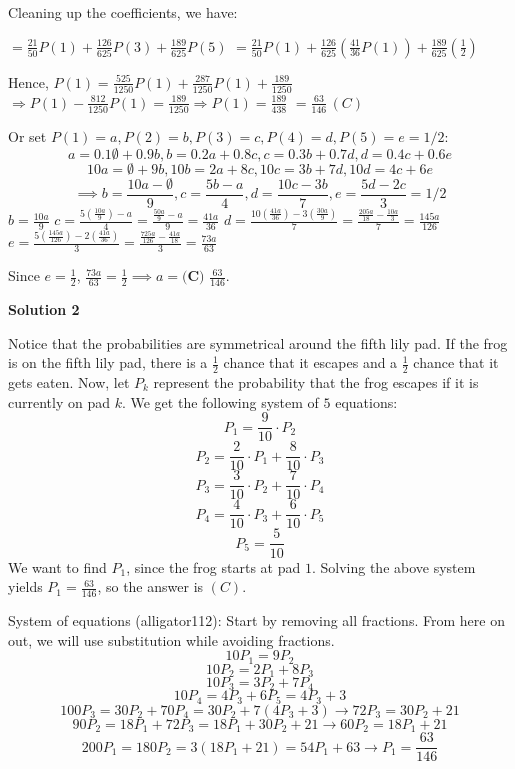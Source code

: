 \begin{enumerate}
 Cleaning up the coefficients, we have: 

 $= \frac {21} {50}P(1) + \frac {126} {625}P(3) + \frac {189} {625}P(5)$
$= \frac {21} {50}P(1) + \frac {126} {625}\left(\frac {41} {36}P(1)\right) + \frac {189} {625}\left(\frac {1} {2}\right)$

 Hence, $P(1) = \frac {525} {1250}P(1) + \frac {287} {1250}P(1) + \frac {189} {1250}$
$\Rightarrow P(1) - \frac {812} {1250}P(1) = \frac {189} {1250} \Rightarrow P(1) = \frac {189} {438}$
$= \boxed{\frac {63} {146}\, (C)}$

 Or set $P(1)=a,P(2)=b,P(3)=c,P(4)=d,P(5)=e=1/2$:
 \[a=0.1\emptyset+0.9b,b=0.2a+0.8c,c=0.3b+0.7d,d=0.4c+0.6e\]
 \[10a=\emptyset+9b,10b=2a+8c,10c=3b+7d,10d=4c+6e\]
 \[\implies b=\frac{10a-\emptyset}{9},c=\frac{5b-a}{4},d=\frac{10c-3b}{7},e=\frac{5d-2c}{3}=1/2\]$b=\frac{10a}{9}$
$c=\frac{5\left(\frac{10a}{9}\right)-a}{4}=\frac{\frac{50a}{9}-a}{9}=\frac{41a}{36}$
$d=\frac{10\left(\frac{41a}{36}\right)-3\left(\frac{30a}{9}\right)}{7}=\frac{\frac{205a}{18}-\frac{10a}{3}}{7}=\frac{145a}{126}$
$e=\frac{5\left(\frac{145a}{126}\right)-2\left(\frac{41a}{36}\right)}{3}=\frac{\frac{725a}{126}-\frac{41a}{18}}{3}=\frac{73a}{63}$

 Since $e=\frac{1}{2}$, $\frac{73a}{63}=\frac{1}{2}\implies a=\boxed{\textbf{(C) }\frac{63}{146}}$.

 



\textbf{Solution 2}

Notice that the probabilities are symmetrical around the fifth lily pad. If the frog is on the fifth lily pad, there is a $\frac{1}{2}$ chance that it escapes and a $\frac{1}{2}$ chance that it gets eaten. Now, let $P_k$ represent the probability that the frog escapes if it is currently on pad $k$. We get the following system of $5$ equations:
 \[P_1=\frac{9}{10}\cdot P_2\]
 \[P_2=\frac{2}{10}\cdot P_1 + \frac{8}{10}\cdot P_3\]
 \[P_3=\frac{3}{10}\cdot P_2 + \frac{7}{10}\cdot P_4\]
 \[P_4=\frac{4}{10}\cdot P_3 + \frac{6}{10}\cdot P_5\]
 \[P_5=\frac{5}{10}\]We want to find $P_1$, since the frog starts at pad $1$. Solving the above system yields $P_1=\frac{63}{146}$, so the answer is $\boxed{(C)}$.

 System of equations (alligator112): Start by removing all fractions. From here on out, we will use substitution while avoiding fractions.
 \[10P_1 = 9P_2\]
 \[10P_2 = 2P_1 + 8P_3\]
 \[10P_3 = 3P_2 + 7P_4\]
 \[10P_4 = 4P_3 + 6P_5 = 4P_3 + 3\]
 \[100 P_3 = 30P_2 + 70P_4 = 30P_2 + 7(4P_3 + 3) \rightarrow 72P_3 = 30P_2 + 21\]
 \[90P_2 = 18P_1 + 72P_3 = 18P_1 + 30P_2 + 21 \rightarrow 60P_2 = 18P_1 + 21\]
 \[200P_1 = 180P_2 = 3(18P_1 + 21) = 54P_1 + 63 \rightarrow P_1 = \frac{63}{146}\]





\end{enumerate}
